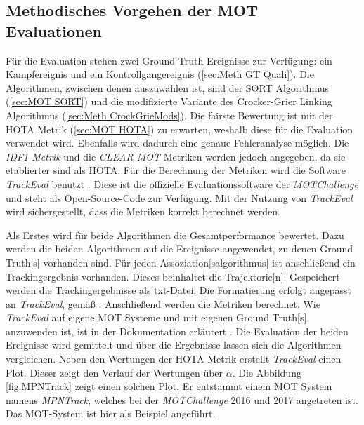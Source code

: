 \subsection{Methodisches Vorgehen der MOT Evaluationen}
Für die Evaluation stehen zwei \gls{Ground Truth} Ereignisse zur Verfügung: ein Kampfereignis und ein Kontrollgangereignis (\autoref{sec:Meth GT Quali}). Die Algorithmen, zwischen denen auszuwählen ist, sind der \acrshort{SORT} Algorithmus (\autoref{sec:MOT SORT}) und die modifizierte Variante des Crocker-Grier Linking Algorithmus (\autoref{sec:Meth CrockGrieMods}). Die fairste Bewertung ist mit der \gls{HOTA} Metrik (\autoref{sec:MOT HOTA}) zu erwarten, weshalb diese für die Evaluation verwendet wird. Ebenfalls wird dadurch eine genaue Fehleranalyse möglich. Die \textit{\gls{IDF1}-Metrik} und die \textit{\acrshort{CLEAR} \gls{MOT}} Metriken werden jedoch angegeben, da sie etablierter sind als \gls{HOTA}. Für die Berechnung der Metriken wird die Software \textit{TrackEval} benutzt \cite{TrackEval.2020}. Diese ist die offizielle Evaluationssoftware der \textit{MOTChallenge} und steht als Open-Source-Code zur Verfügung. Mit der Nutzung von \textit{TrackEval} wird sichergestellt, dass die Metriken korrekt berechnet werden. \par

Als Erstes wird für beide Algorithmen die Gesamtperformance bewertet. Dazu werden die beiden Algorithmen auf die Ereignisse angewendet, zu denen \gls{Ground Truth}[s] vorhanden sind. Für jeden \gls{Assoziation}[salgorithmus] ist anschließend ein Trackingergebnis vorhanden. Dieses beinhaltet die \gls{Trajektorie}[n]. Gespeichert werden die Trackingergebnisse als txt-Datei. Die Formatierung erfolgt angepasst an \textit{TrackEval}, gemäß \cite{MOT15}. Anschließend werden die Metriken berechnet. Wie \textit{TrackEval} auf eigene \gls{MOT} Systeme und mit eigenen \gls{Ground Truth}[s] anzuwenden ist, ist in der Dokumentation erläutert \cite{TrackEval.2020}. Die Evaluation der beiden Ereignisse wird gemittelt und über die Ergebnisse lassen sich die Algorithmen vergleichen. Neben den Wertungen der \gls{HOTA} Metrik erstellt \textit{TrackEval} einen Plot. Dieser zeigt den Verlauf der Wertungen über \(\alpha\). Die Abbildung \ref{fig:MPNTrack} zeigt einen solchen Plot. Er entstammt einem \gls{MOT} System namens \textit{MPNTrack}, welches bei der \textit{MOTChallenge} 2016 und 2017 angetreten ist. Das MOT-System ist hier als Beispiel angeführt. 

